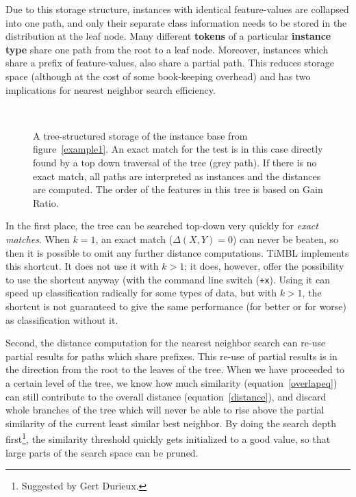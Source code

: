 \documentclass{report}
\begin{document}
Due to this storage structure, instances with identical feature-values
are collapsed into one path, and only their separate class
information needs to be stored in the distribution at the leaf
node. Many different {\bf tokens} of a particular {\bf instance type}
share one path from the root to a leaf node. Moreover, instances which
share a prefix of feature-values, also share a partial path. This
reduces storage space (although at the cost of some book-keeping
overhead) and has two implications for nearest neighbor search
efficiency.

\begin{figure}[htb]
        \begin{center}
                \leavevmode
                \columnwidth
                \
                \caption{A tree-structured storage of the instance
                base from figure~\ref{example1}. An exact match for
                the test is in this case directly found by a top down
                traversal of the tree (grey path). If there is no
                exact match, all paths are interpreted as instances
                and the distances are computed. The order of the
                features in this tree is based on Gain Ratio.
                }
                \label{example2}
        \end{center}
\end{figure}

In the first place, the tree can be searched top-down very quickly for
{\em exact matches}. When $k=1$, an exact match ($\Delta(X,Y)=0$) can
never be beaten, so then it is possible to omit any further distance
computations. TiMBL implements this shortcut. It does not use it with
$k>1$; it does, however, offer the possibility to use the shortcut
anyway (with the command line switch ({\tt +x}). Using it can speed up
classification radically for some types of data, but with $k>1$, the
shortcut is not guaranteed to give the same performance (for better or
for worse) as classification without it.

Second, the distance computation for the nearest neighbor search can
re-use partial results for paths which share prefixes.  This re-use of
partial results is in the direction from the root to the leaves of the
tree. When we have proceeded to a certain level of the tree, we know
how much similarity (equation~\ref{overlapeq}) can still contribute to
the overall distance (equation~\ref{distance}), and discard whole
branches of the tree which will never be able to rise above the
partial similarity of the current least similar best neighbor. By
doing the search depth first\footnote{Suggested by Gert Durieux.}, the
similarity threshold quickly gets initialized to a good value, so that
large parts of the search space can be pruned.
\end{document}
